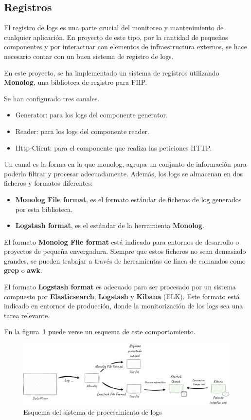 \subsection{Registros}

El registro de logs es una parte crucial del monitoreo y mantenimiento de cualquier aplicación.
En proyecto de este tipo, por la cantidad de pequeños componentes y por interactuar con elementos de infraestructura
externos, se hace necesario contar con un buen sistema de registro de logs.

En este proyecto, se ha implementado un sistema de registros utilizando \textbf{Monolog}, una biblioteca de registro
para PHP.

Se han configurado tres canales.

\begin{itemize}
    \item Generator: para los logs del componente generator.
    \item Reader: para los logs del componente reader.
    \item Http-Client: para el componente que realiza las peticiones HTTP.
\end{itemize}

Un canal es la forma en la que monolog, agrupa un conjunto de información para poderla filtrar y procesar adecuadamente.
Además, los logs se almacenan en dos ficheros y formatos diferentes:

\begin{itemize}
    \item \textbf{Monolog File format}, es el formato estándar de ficheros de log generados por esta biblioteca.
    \item \textbf{Logstash format}, es el estándar de la herramienta \textbf{Monolog}.
\end{itemize}

El formato \textbf{Monolog File format} está indicado para entornos de desarrollo o proyectos de pequeña envergadura.
Siempre que estos ficheros no sean demasiado grandes, se pueden trabajar a través de herramientas de línea de comandos
como \textbf{grep} o \textbf{awk}.

El formato \textbf{Logstash format} es adecuado para ser procesado por un sistema compuesto por
\textbf{Elasticsearch}, \textbf{Logstash} y \textbf{Kibana} (ELK).
Este formato está indicado en entornos de producción, donde la monitorización de los logs sea una tarea relevante.

En la figura~\ref{fig:chapter_4.4.logs_overview} puede verse un esquema de este comportamiento.

\begin{figure}[ht]
    \begin{center}
        \includegraphics[width=\textwidth]{./chapter/4/images/chapter_4.4.logs_overview}
        \caption{Esquema del sistema de procesamiento de logs}
        \label{fig:chapter_4.4.logs_overview}
    \end{center}
\end{figure}